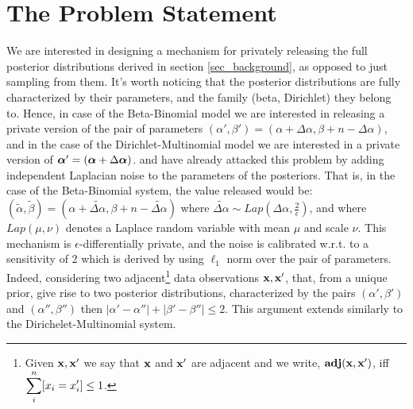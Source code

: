 \documentclass[sigconf]{acmart}
\begin{document}
\section{The Problem Statement}
\label{sec:base}
We are interested in designing a mechanism for privately releasing the full posterior
distributions derived in section \ref{sec_background}, as opposed to just sampling from them.
It's worth noticing that the posterior distributions are fully characterized
by their parameters, and the family (beta, Dirichlet) they belong to. Hence, in case of the
Beta-Binomial model we are interested in releasing a private version of the pair of
parameters $(\alpha',\beta')=(\alpha + \Delta \alpha,\beta + n - \Delta \alpha)$, and
in the case of the Dirichlet-Multinomial model we are interested in a private version of
$\boldsymbol{\alpha}'=(\boldsymbol{\alpha} + \Delta \boldsymbol{\alpha})$. \citet{zhang2016differential} and \citet{xiao2012bayesian}
have already attacked this problem by adding independent Laplacian noise to the
parameters of the posteriors. That is, in the case of the Beta-Binomial system,
the value released would  be: $(\tilde\alpha,\tilde\beta)=(\alpha +  \widetilde{\Delta \alpha},\beta + n - \widetilde{\Delta \alpha})$
where $\widetilde{\Delta \alpha}\sim Lap(\Delta \alpha, \frac{2}{\epsilon})$,
and where $Lap(\mu,\nu)$ denotes a Laplace random variable with mean $\mu$ and scale $\nu$.
This mechanism is $\epsilon$-differentially private, and the noise is
calibrated w.r.t. to a sensitivity of 2 which is derived by using
$\ell_1$ norm over the pair of parameters. Indeed, considering two
adjacent\footnote{Given $\textbf{x}, \textbf{x}'$  we say that $\textbf{x}$ and $\textbf{x}'$ are adjacent and we write, $\textbf{adj}(\textbf{x},\textbf{x}')$, iff\\
$\displaystyle \sum_{i}^{n}[x_i = x'_i ]\leq 1$. } data observations
$\textbf{x}, \textbf{x}'$, that, from a unique prior, give rise to two posterior
distributions, characterized by the pairs
$(\alpha',\beta')$ and $(\alpha'',\beta'')$ then
$|\alpha'-\alpha''|+|\beta'-\beta''|\leq 2$.
This argument extends similarly to the Dirichelet-Multinomial system.
\end{document}
